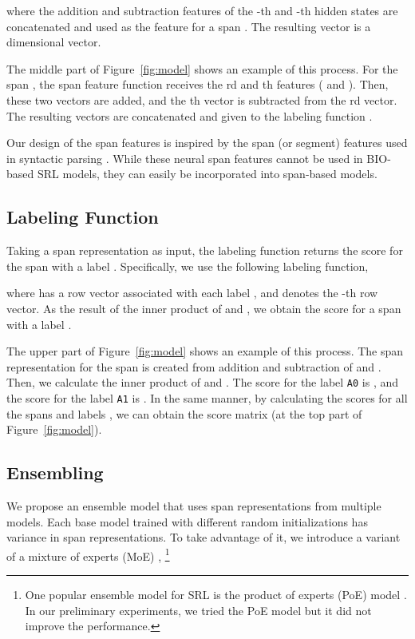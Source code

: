 \documentclass[11pt,a4paper]{article}
\begin{document}
\noindent
where the addition and subtraction features of the -th and -th hidden states are concatenated and used as the feature for a span .
The resulting vector  is a  dimensional vector.

The middle part of Figure~\ref{fig:model} shows an example of this process.
For the span , the span feature function  receives the rd and th features ( and ).
Then, these two vectors are added, and the th vector is subtracted from the rd vector.
The resulting vectors are concatenated and given to the labeling function .

Our design of the span features is inspired by the span (or segment) features used in syntactic parsing \cite{wang:16,stern:17,teranishi:17}.
While these neural span features cannot be used in BIO-based SRL models, they can easily be incorporated into span-based models.

\subsection*{Labeling Function}
Taking a span representation  as input, the labeling function  returns the score for the span  with a label .
Specifically, we use the following labeling function,


\noindent       
where  has a row vector associated with each label , and  denotes the -th row vector.
As the result of the inner product of  and , we obtain the score for a span  with a label .

The upper part of Figure~\ref{fig:model} shows an example of this process.
The span representation  for the span  is created from addition and subtraction of  and .
Then, we calculate the inner product of  and .
The score for the label {\tt A0} is , and the score for the label {\tt A1} is .
In the same manner, by calculating the scores for all the spans  and labels , we can obtain the score matrix (at the top part of Figure~\ref{fig:model}).

\subsection{Ensembling}
\label{sec:mos}
We propose an ensemble model that uses span representations from multiple models.
Each base model trained with different random initializations has variance in span representations.
To take advantage of it, we introduce a variant of a mixture of experts (MoE) \cite{shazeer:17},
\footnote{One popular ensemble model for SRL is the product of experts (PoE) model \cite{fitzgerald:15,he:17,tan:18}.
In our preliminary experiments, we tried the PoE model but it did not improve the performance.}
\end{document}
